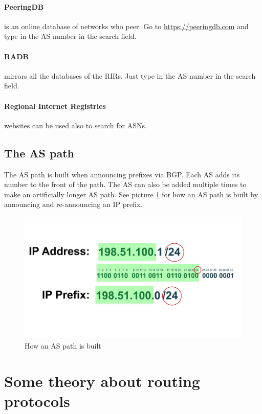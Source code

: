 \paragraph{PeeringDB}
is an online database of networks who peer. Go to
\url{https://peeringdb.com} and type in the AS number in the search field.

\paragraph{RADB}
mirrors all the databases of the \glspl{RIR}. Just type in the AS number in
the search field.

\paragraph{Regional Internet Registries}
websites can be used also to search for \glspl{ASN}.

\subsection{The AS path}
The AS path is built when announcing prefixes via BGP.
Each AS adds its number to the front of the path. The AS can also be added
multiple times to make an artificially longer AS path. See picture \ref{fig:aspath}
for how an AS path is built by announcing and re-announcing an IP prefix.

\begin{figure}
  \centering
  \includegraphics[width=\linewidth,page=2]{img/Drawings.pdf}
  \caption{How an AS path is built}
  \label{fig:aspath}
\end{figure}


\section{Some theory about routing protocols}
